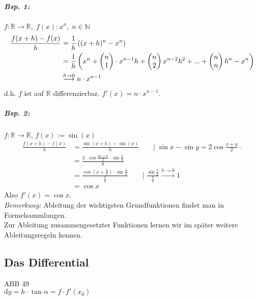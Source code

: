 \subparagraph{Bsp. 1:} $f: \mathbb{R}\to \mathbb{R}, \; f(x): x^n, \; n \in \mathbb{N}$
\begin{align*}
\frac{f(x+h)-f(x)}{h}&=\frac{1}{h}\left((x+h)^n-x^n\right)\\
&=\frac{1}{h}\left(x^n+\begin{pmatrix}n\\1\end{pmatrix}\cdot x^{n-1}h+\begin{pmatrix}n\\2\end{pmatrix}x^{n-2}h^2+...+\begin{pmatrix}n\\n\end{pmatrix}h^n-x^n\right)\\
&\overset{h\to 0}{\longrightarrow}n\cdot x^{n-1}
\end{align*}
d.h. $f$ ist auf $\mathbb{R}$ differenzierbar. $f'(x)=n\cdot x^{n-1}$.

\subparagraph{Bsp. 2:} $f: \mathbb{R} \to \mathbb{R}$, $f(x):= \sin(x)$
\begin{align*}
\frac{f(x+h)-f(x)}{h}&=\frac{\sin(x+h)-\sin(x)}{h} \qquad |\; \sin x-\sin y=2\cos\frac{x+y}{2}\cdot\\
&= \frac{2\cdot \cos \frac{2x+h}{2}\cdot \sin \frac{h}{2}}{h}\\
&= \frac{\cos \left( x+\frac{h}{2}\right) \cdot \sin \frac{h}{2}}{\frac{h}{2}} \qquad |\; \frac{\sin \frac{h}{2}}{\frac{h}{2}} \overset{h\to 0}{\longrightarrow}1\\
&= \cos x
\end{align*}
Also $f'(x)=\cos x$.\\
\emph{Bemerkung:} Ableitung der wichtigsten Grundfunktionen findet man in Formelsammlungen.\\
Zur Ableitung zusammengesetzter Funktionen lernen wir im später weitere Ableitungsregeln kennen.

\subsection{Das Differential} \parskp
ABB 49\\
$\mathrm{d}y=h\cdot \tan \alpha = f \cdot f'(x_0)$
